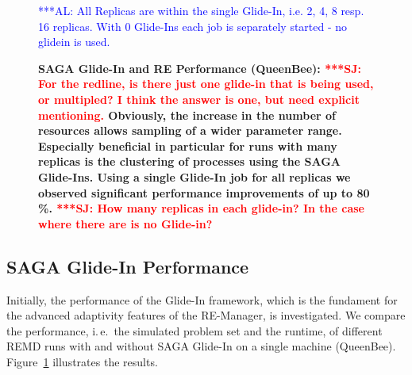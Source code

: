 \documentclass{rspublic}
\newcommand{\alnote}[1]{ {\textcolor{blue} { ***AL: #1 }}}
\newcommand{\jhanote}[1]{ {\textcolor{red} { ***SJ: #1 }}}
\newcommand{\alnote}[1]{}
\newcommand{\jhanote}[1]{}
\begin{document}
\begin{figure}[th]
    \centering      
        \caption{\footnotesize \bf SAGA Glide-In and RE Performance
          (QueenBee): \jhanote{For the redline, is there just one
            glide-in that is being used, or multipled? I think the
            answer is one, but need explicit mentioning.} 
          Obviously,
          the increase in the number of resources allows sampling of a
          wider parameter range. Especially beneficial in particular
          for runs with many replicas is the clustering of
          processes using the SAGA Glide-Ins. Using a single Glide-In
          job for all replicas we observed significant performance 
          improvements of up to 80\,\%.
          \jhanote{How many
            replicas in each glide-in? In the case where there are is
            no Glide-in?}}     
           \alnote{All Replicas are within the single Glide-In, i.e. 2, 4, 8 resp. 16 replicas.
           With 0 Glide-Ins each job is separately started - no glidein is used.}
    \label{fig:perf_remd_glidin}
\end{figure} 

\subsection{SAGA Glide-In Performance}

Initially, the performance of the Glide-In framework, which is the 
fundament for the advanced adaptivity features of the RE-Manager, is investigated. 
We compare the performance, i.\,e.\ the simulated
problem set and the runtime, of different REMD runs with and without 
SAGA Glide-In on a single machine (QueenBee). 
Figure~\ref{fig:perf_remd_glidin} illustrates the results.
\end{document}
